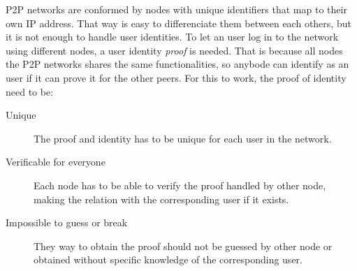 P2P networks are conformed by nodes with unique identifiers that map to their
own IP address. That way is easy to differenciate them between each others, but
it is not enough to handle user identities. To let an user log in to the
network using different nodes, a user identity \textit{proof} is needed. That
is because all nodes the P2P networks shares the same functionalities, so
anybode can identify as an user if it can prove it for the other peers. For
this to work, the proof of identity need to be:
\begin{description}
  \item[Unique] The proof and identity has to be unique for each user in the network.

  \item[Verificable for everyone]  Each node has to be able to verify the proof
    handled by other node, making the relation with the corresponding user if it
    exists.
  \item[Impossible to guess or break] They way to obtain the proof should not
    be guessed by other node or obtained without specific knowledge of the
    corresponding user.
\end{description}





